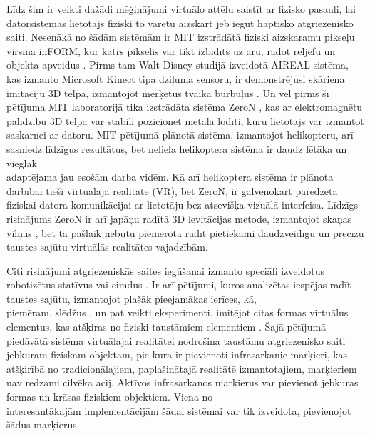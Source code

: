 \documentclass[12pt, a4paper, oneside, openright]{article}
\begin{document}
\par
Līdz šim ir veikti dažādi mēģinājumi virtuālo attēlu saistīt ar fizisko pasauli, 
lai datorsistēmas lietotājs fiziski to varētu aizskart
jeb iegūt haptisko atgriezenisko saiti. 
Nesenākā no šādām sistēmām ir MIT izstrādātā fiziski aizskaramu pikseļu virsma inFORM, 
kur katrs pikselis var tikt izbīdīts uz āru, radot reljefu un objekta apveidus 
\cite{sean_follmer_inform:_2013}. Pirms tam Walt Disney studijā izveidotā AIREAL sistēma, kas izmanto Microsoft Kinect tipa dziļuma sensoru, ir demonstrējusi skāriena imitāciju 3D telpā, izmantojot mērķētus tvaika burbuļus \cite{rajinder_sodhi_aireal:_2013}. Un vēl pirms šī pētījuma MIT laboratorijā tika izstrādāta sistēma ZeroN \cite{jinha_lee_zeron:_2011}, kas ar elektromagnētu palīdzību 3D telpā var stabili pozicionēt metāla lodīti, kuru lietotājs var izmantot saskarnei ar datoru. 
MIT pētījumā plānotā sistēma, izmantojot helikopteru, arī sasniedz līdzīgus rezultātus, bet neliela helikoptera sistēma ir daudz lētāka un vieglāk \\
adaptējama jau esošām darba vidēm. Kā arī helikoptera sistēma ir plānota darbībai tieši virtuālajā realitātē (VR), bet ZeroN, ir galvenokārt paredzēta fiziskai datora komunikācijai ar lietotāju bez atsevišķa vizuālā interfeisa. Līdzīgs risinājums ZeroN ir arī japāņu radītā 3D levitācijas metode, izmantojot skaņas viļņus \cite{yoichi_ochiai_three-dimensional_2013}, bet tā pašlaik nebūtu piemērota radīt pietiekami daudzveidīgu un precīzu taustes sajūtu virtuālās realitātes vajadzībām.
\par
Citi risinājumi atgriezeniskās saites iegūšanai izmanto speciāli izveidotus robotizētus statīvus 
vai cimdus 
\cite{jose-luis_rodrguez_haptic_2012} 
\cite{andrea_f.abate_haptic-based_2009}. 
Ir arī pētījumi, kuros analizētas iespējas radīt taustes sajūtu, 
izmantojot plašāk pieejamākas ierīces, kā, \\ piemēram, slēdžus \cite{monica_bordegoni_haptic_2006}, 
un pat veikti eksperimenti, imitējot citas formas virtuālus elementus, 
kas atšķiras no fiziski taustāmiem elementiem \cite{luv_kohli_warping_2013}. 
%
Šajā pētījumā piedāvātā sistēma virtuālajai realitātei nodrošina taustāmu atgriezenisko saiti
jebkuram fiziskam objektam, pie kura ir pievienoti infrasarkanie marķieri, kas atšķirībā no
tradicionālajiem, paplašinātajā realitātē izmantotajiem, marķieriem nav redzami cilvēka acij.
Aktīvos infrasarkanos marķierus var pievienot jebkuras formas un krāsas fiziskiem objektiem. 
Viena no \\ interesantākajām implementācijām šādai sistēmai var tik izveidota, pievienojot šādus marķierus 
\end{document}
